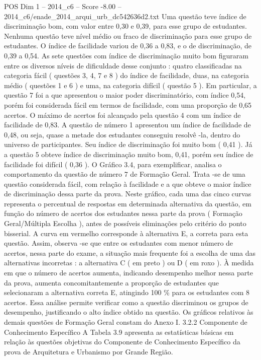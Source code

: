\begin{textsample}{POS Dim 1 – 2014\_c6 – Score -8.00 – 2014\_c6/enade\_2014\_arqui\_urb\_dc542636d2.txt}
Uma questão teve índice de discriminação bom, com valor entre 0,30 e 0,39, para esse grupo de estudantes.
Nenhuma questão teve nível médio ou fraco de discriminação para esse grupo de estudantes.
O índice de facilidade variou de 0,36 a 0,83, e o de discriminação, de 0,39 a 0,54.
As sete questões com índice de discriminação muito bom figuraram entre os diversos níveis de dificuldade desse conjunto : quatro classificadas na categoria fácil ( questões 3, 4, 7 e 8 ) do índice de facilidade, duas, na categoria médio ( questões 1 e 6 ) e uma, na categoria difícil ( questão 5 ).
Em particular, a questão 7 foi a que apresentou o maior poder discriminatório, com índice 0,54, porém foi considerada fácil em termos de facilidade, com uma proporção de 0,65 acertos.
O máximo de acertos foi alcançado pela questão 4 com um índice de facilidade de 0,83.
A questão de número 1 apresentou um índice de facilidade de 0,48, ou seja, quase a metade dos estudantes conseguiu resolvê -la, dentro do universo de participantes.
Seu índice de discriminação foi muito bom ( 0,41 ).
Já a questão 5 obteve índice de discriminação muito bom, 0,41, porém seu índice de facilidade foi difícil ( 0,36 ).
O Gráfico 3.4, para exemplificar, analisa o comportamento da questão de número 7 de Formação Geral.
Trata -se de uma questão considerada fácil, com relação à facilidade e a que obteve o maior índice de discriminação dessa parte da prova.
Neste gráfico, cada uma das cinco curvas representa o percentual de respostas em determinada alternativa da questão, em função do número de acertos dos estudantes nessa parte da prova ( Formação Geral/Múltipla Escolha ), antes de possíveis eliminações pelo critério do ponto bisserial.
A curva em vermelho corresponde à alternativa E, a correta para esta questão.
Assim, observa -se que entre os estudantes com menor número de acertos, nessa parte do exame, a situação mais frequente foi a escolha de uma das alternativas incorretas : a alternativa C ( em preto ) ou D ( em roxo ).
À medida em que o número de acertos aumenta, indicando desempenho melhor nessa parte da prova, aumenta concomitantemente a proporção de estudantes que selecionaram a alternativa correta E, atingindo 100 \% para os estudantes com 8 acertos.
Essa análise permite verificar como a questão discriminou os grupos de desempenho, justificando o alto índice obtido na questão.
Os gráficos relativos às demais questões de Formação Geral constam do Anexo I. 3.2.2 Componente de Conhecimento Específico A Tabela 3.9 apresenta as estatísticas básicas em relação às questões objetivas do Componente de Conhecimento Específico da prova de Arquitetura e Urbanismo por Grande Região.

\end{textsample}
